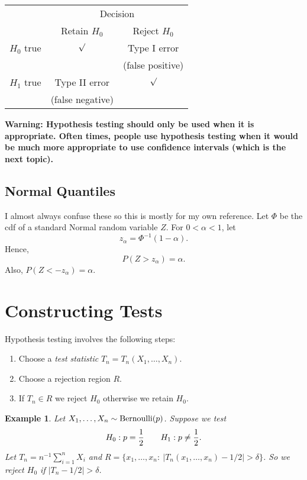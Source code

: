 \documentclass[twoside,12pt]{article}
\newtheorem{example}[theorem]{Example}
\begin{document}
\vspace{1cm}

\begin{center}
\begin{tabular}{|c|c|c|} \hline
 & \multicolumn{2}{c}{Decision} \\
 & Retain $H_0$ & Reject $H_0$\\ \hline
$H_0$ true & $\surd$ & Type I error \\
           &         & (false positive)\\ \hline
$H_1$ true & Type II error & $\surd$\\
           & (false negative) & \\ \hline
\end{tabular}
\end{center}    

\vspace{1cm}

{\bf Warning: Hypothesis testing should only be used when it is appropriate.
Often times, people use hypothesis testing when it would be much more
appropriate to use confidence intervals (which is the next topic).}

\subsection{Normal Quantiles}
I almost always confuse these so this is mostly for my own reference.
Let $\Phi$ be the cdf of a standard Normal random variable $Z$.
For $0 < \alpha < 1$, let
$$
z_\alpha = \Phi^{-1}(1-\alpha).
$$
Hence,
$$
P(Z > z_\alpha) = \alpha.
$$
Also,
$P(Z < - z_\alpha) = \alpha$.



\section{Constructing Tests}

Hypothesis testing involves the following steps:

\begin{enumerate}
\item Choose a {\em test statistic} $T_n = T_n(X_1,\ldots, X_n)$.
\item Choose a rejection region $R$.
\item If $T_n\in R$ we reject $H_0$ otherwise we retain $H_0$.
\end{enumerate}

\begin{example}
Let $X_1,\ldots, X_n \sim {\rm Bernoulli}(p)$.
Suppose we test
$$
H_0: p= \frac{1}{2}\ \ \ {\rm }\ \ \ H_1: p\neq \frac{1}{2}.
$$
Let $T_n = n^{-1}\sum_{i=1}^n X_i$ and
$R = \{ x_1,\ldots,x_n:\ |T_n(x_1,\ldots, x_n)-1/2| > \delta\}$.
So we reject $H_0$ if
$|T_n-1/2| > \delta$.
\end{example}
\end{document}
